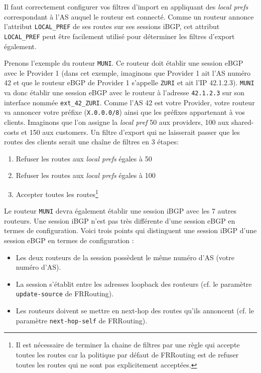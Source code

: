 \documentclass[a4paper, 11pt]{article}
\begin{document}
Il faut correctement configurer vos filtres d'import en appliquant
des \textit{local prefs} correspondant à l'AS auquel le routeur est connecté.
Comme un routeur annonce l'attribut \texttt{LOCAL\_PREF} de ses routes
sur ses sessions iBGP, cet attribut \texttt{LOCAL\_PREF} peut être
facilement utilisé pour déterminer les filtres d'export également.

Prenons l'exemple du routeur \texttt{MUNI}. Ce routeur doit
établir une session eBGP avec le Provider 1 (dans cet exemple,
imaginons que Provider 1 ait l'AS numéro 42 et que le routeur eBGP
de Provider 1 s'appelle \texttt{ZURI} et ait l'IP 42.1.2.3).
\texttt{MUNI} va donc établir une session eBGP avec le routeur
à l'adresse \texttt{42.1.2.3} sur son interface nommée
\texttt{ext\_42\_ZURI}. Comme l'AS 42 est votre Provider, votre
routeur va annoncer votre préfixe (\texttt{X.0.0.0/8}) ainsi que
les préfixes appartenant à vos clients.
Imaginons que l'on assigne la \textit{local pref} 50 aux providers, 100 aux
shared-costs et 150 aux customers. Un filtre d'export qui ne laisserait
passer que les routes des clients serait une chaîne de filtres en 3
étapes:
\begin{enumerate}
    \item Refuser les routes aux \textit{local prefs} égales à 50
    \item Refuser les routes aux \textit{local prefs} égales à 100
    \item Accepter toutes les routes\footnote{Il est nécessaire
    de terminer la chaine de filtres par une règle qui accepte
    toutes les routes car la politique par défaut de FRRouting est
    de refuser toutes les routes qui ne sont pas explicitement
    acceptées.}
\end{enumerate}

Le routeur \texttt{MUNI} devra également établir une session iBGP
avec les 7 autres routeurs. Une session iBGP n'est pas très différente
d'une session eBGP en termes de configuration. Voici trois points
qui distinguent une session iBGP d'une session eBGP en termes de configuration :

\begin{itemize}
    \item Les deux routeurs de la session possèdent le même numéro d'AS
          (votre numéro d'AS).
    \item La session s'établit entre les adresses loopback des routeurs
          (cf. le paramètre \texttt{update-source} de FRRouting).
    \item Les routeurs doivent se mettre en next-hop des routes qu'ils
          annoncent (cf. le paramètre \texttt{next-hop-self} de FRRouting).
\end{itemize}
\end{document}
